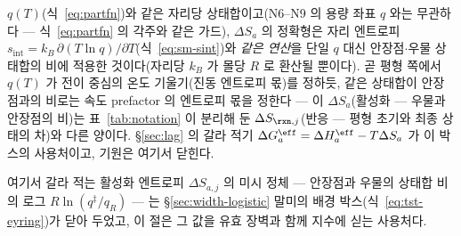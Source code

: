 \begin{bgbox}
$q(T)$(식~\eqref{eq:partfn})와 같은 자리당 상태합이고(N6--N9 의 용량 좌표 $q$ 와는 무관하다 ---
식~\eqref{eq:partfn} 의 각주와 같은 가드), $\Delta S_a$ 의 정확형은 자리 엔트로피
$s_\mathrm{int}=k_B\,\partial(T\ln q)/\partial T$(식~\eqref{eq:sm-sint})와 \emph{같은 연산}을 단일
$q$ 대신 안장점$\cdot$우물 상태합의 비에 적용한 것이다(자리당 $k_B$ 가 몰당 $R$ 로 환산될 뿐이다).
곧 평형 쪽에서 $q(T)$ 가 전이 중심의 온도 기울기(진동 엔트로피 몫)를 정하듯, 같은 상태합이
안장점과의 비로는 속도 prefactor 의 엔트로피 몫을 정한다 --- 이 $\Delta S_a$(활성화 --- 우물과
안장점의 비)는 표~\ref{tab:notation} 이 분리해 둔 $\Delta S_{\rxn,j}$(반응 --- 평형 초기와 최종
상태의 차)와 다른 양이다. \S\ref{sec:lag} 의 갈라 적기 $\Delta G_a^\eff=\Delta H_a^\eff-T\Delta S_a$
가 이 박스의 사용처이고, 기원은 여기서 닫힌다.
\end{bgbox}

여기서 갈라 적는 활성화 엔트로피 $\Delta S_{a,j}$ 의 미시 정체 --- 안장점과 우물의 상태합 비의 로그
$R\ln(q^{\ddagger}/q_R)$ --- 는 \S\ref{sec:width-logistic} 말미의 배경 박스(식~\eqref{eq:tst-eyring})가
닫아 두었고, 이 절은 그 값을 유효 장벽과 함께 지수에 싣는 사용처다.
